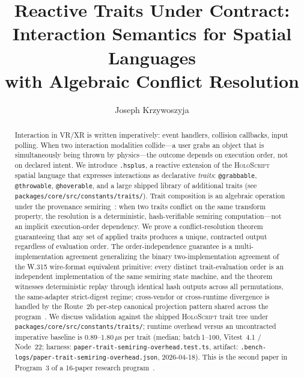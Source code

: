 \documentclass[sigconf,nonacm]{acmart}
\title{Reactive Traits Under Contract:\\
Interaction Semantics for Spatial Languages\\
with Algebraic Conflict Resolution}
\author{Joseph Krzywoszyja}
\affiliation{%
  \institution{Infinitus Systems}
  \country{USA}
}
\makeatletter
\newcommand{\holoscript}{\textsc{HoloScript}}
\newcommand{\hsplus}{\texttt{.hsplus}}
\newcommand{\traitop}[1]{\texttt{@#1}}
\makeatother
\begin{document}
\begin{abstract}
Interaction in VR/XR is written imperatively: event handlers,
collision callbacks, input polling. When two interaction
modalities collide---a user grabs an object that is simultaneously
being thrown by physics---the outcome depends on execution order,
not on declared intent. We introduce \hsplus{}, a reactive
extension of the \holoscript{} spatial language that expresses
interactions as declarative \emph{traits}: \traitop{grabbable},
\traitop{throwable}, \traitop{hoverable}, and a large shipped library
of additional traits (see \texttt{packages/core/src/constants/traits/}).
Trait composition is an algebraic operation
under the provenance semiring~\cite{green-semiring2007}: when two
traits conflict on the same transform property, the resolution is
a deterministic, hash-verifiable semiring computation---not an
implicit execution-order dependency. We prove a conflict-resolution
theorem guaranteeing that any set of applied traits produces a
unique, contracted output regardless of evaluation order. The
order-independence guarantee is a multi-implementation agreement
generalizing the binary two-implementation agreement of the W.315
wire-format equivalent primitive: every distinct trait-evaluation
order is an independent implementation of the same semiring
state machine, and the theorem witnesses deterministic replay through
identical hash outputs across all permutations, the same-adapter
strict-digest regime; cross-vendor or cross-runtime divergence is
handled by the Route~2b per-step canonical projection pattern shared
across the program~\cite{paper-0c-twin-test-2026-05-11}. We
discuss validation against the shipped \holoscript{} trait tree
under \texttt{packages/core/src/constants/traits/}; runtime overhead
versus an uncontracted imperative baseline is $0.89$--$1.80\,\mu\text{s}$ per trait (median;
batch\,1--100, Vitest~4.1 / Node~22; 
harness: \texttt{paper-trait-semiring-overhead.test.ts},
artifact: \texttt{.bench-logs/paper-trait-semiring-overhead.json}, 2026-04-18). This is the
second paper in Program~3 of a 16-paper research
program~\cite{trustbyconstruction2026,capstone-uist2027}.
\end{abstract}


\maketitle
\end{document}
